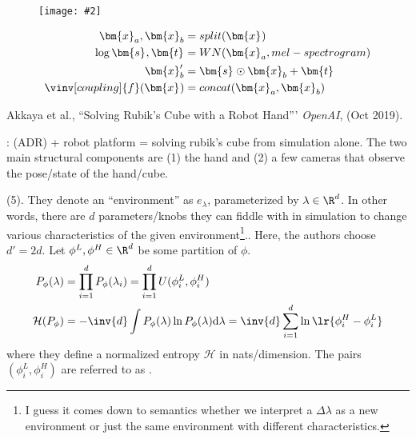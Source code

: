 \documentclass[11pt]{article}
\renewcommand\vec[2][]{\bm{#2}_{#1}}
\newcommand\myfig[2][0.3\textwidth]{\begin{figure}[h!]\centering\texttt{[image: \#2]}\end{figure}}
\newcommand\myspace[1][]{\vspace{#1\bigskipamount}}
\newcommand\p{\Needspace{10\baselineskip} \noindent}
\newcommand\bluesec[1]{\myspace \p \blue{#1}}
\begin{document}
\myfig[0.3\textwidth]{figs/waveglow.png}


\begin{align}
	\vec[a]{x}, \vec[b]{x}
		&= split(\vec x) \\
	\log \vec s , \vec t
		&= WN(\vec[a]{x}, mel-spectrogram) \\
	\vec[b]{x}'
		&= \vec s \odot \vec[b]{x} + \vec t \\
	\vinv[coupling]{f}(\vec x)
		&= concat(\vec[a]{x}, \vec[b]{x})
\end{align}





\vspace{-1em}
{\footnotesize Akkaya et al., ``Solving Rubik's Cube with a Robot Hand''' \textit{OpenAI}, (Oct 2019).}

\bluesec{TL;DR}:  (ADR) + robot platform = solving rubik's cube from simulation alone. The two main structural components are (1) the hand and (2) a few cameras that observe the pose/state of the hand/cube.

\bluesec{ADR} (5). They denote an ``environment'' as $e_{\lambda}$, parameterized by $\lambda \in \R^d$. In other words, there are $d$ parameters/knobs they can fiddle with in simulation to change various characteristics of the given environment\footnote{I guess it comes down to semantics whether we interpret a $\Delta \lambda$ as a new environment or just the same environment with different characteristics.}.. Here, the authors choose $d' = 2d$. Let $\phi^L, \phi^H \in \R^d$ be some partition of $\phi$.
\begin{align}
	P_{\phi}(\lambda)
		&= \prod_{i=1}^{d} P_{\phi}(\lambda_i) = \prod_{i=1}^{d} U(\phi_i^L, \phi_i^H) \\
	\mathcal H(P_{\phi})
		&= - \inv{d} \int P_{\phi}(\lambda) \ln P_{\phi}(\lambda) \mathrm{d} \lambda
		= \inv{d} \sum_{i=1}^d \ln \lr{ \phi_i^H - \phi_i^L }
\end{align}
where they define a normalized entropy $\mathcal H$ in nats/dimension. The pairs $(\phi_i^L, \phi_i^H)$ are referred to as . 
\end{document}
